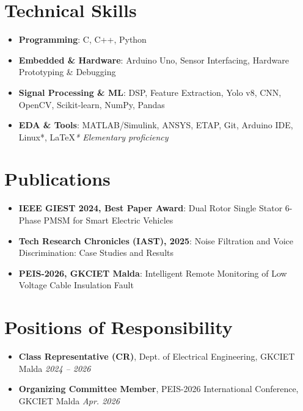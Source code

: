\documentclass[a4paper,9pt]{extarticle}
\begin{document}
\section{Technical Skills}
\begin{itemize}[label=$\bullet$,leftmargin=1em,topsep=2pt,itemsep=1pt,parsep=0pt]
  \item \textbf{Programming}: C, C++, Python
  \item \textbf{Embedded \& Hardware}: Arduino Uno, Sensor Interfacing, Hardware Prototyping \& Debugging
  \item \textbf{Signal Processing \& ML}: DSP, Feature Extraction, Yolo v8, CNN, OpenCV, Scikit-learn, NumPy, Pandas
  \item \textbf{EDA \& Tools}: MATLAB/Simulink, ANSYS, ETAP, Git, Arduino IDE, Linux*, \LaTeX \hfill \textit{* Elementary proficiency}
\end{itemize}

\section{Publications}
\begin{itemize}[label=$\bullet$,leftmargin=1em,topsep=2pt,itemsep=1pt,parsep=0pt]
  \item \textbf{IEEE GIEST 2024, Best Paper Award}: Dual Rotor Single Stator 6-Phase PMSM for Smart Electric Vehicles
  \item \textbf{Tech Research Chronicles (IAST), 2025}: Noise Filtration and Voice Discrimination: Case Studies and Results
  \item \textbf{PEIS-2026, GKCIET Malda}: Intelligent Remote Monitoring of Low Voltage Cable Insulation Fault
\end{itemize}

\section{Positions of Responsibility}
\begin{itemize}[label=$\bullet$,leftmargin=1em,topsep=2pt,itemsep=1pt,parsep=0pt]
  \item \textbf{Class Representative (CR)}, Dept. of Electrical Engineering, GKCIET Malda \hfill \textit{2024 -- 2026}
  \item \textbf{Organizing Committee Member}, PEIS-2026 International Conference, GKCIET Malda \hfill \textit{Apr. 2026}
\end{itemize}
\end{document}
